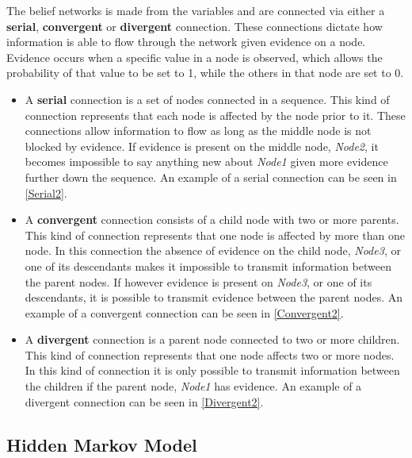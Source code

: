 The belief networks is made from the variables and are connected via either a
\textbf{serial}, \textbf{convergent} or \textbf{divergent} connection. These
connections dictate how information is able to flow through the network given
evidence on a node. Evidence occurs when a specific value in a node is observed,
which allows the probability of that value to be set to 1, while the others in
that node are set to 0.
\begin{itemize}
  \item A \textbf{serial} connection is a set of nodes connected in a sequence.
  This kind of connection represents that each node is affected by the node
  prior to it. These connections allow information to flow as long as the middle
  node is not blocked by evidence. If evidence is present on the middle node,
  \textit{Node2}, it becomes impossible to say anything new about
  \textit{Node1} given more evidence further down the sequence. An example of a
  serial connection can be seen in \autoref{Serial2}.
  \item A \textbf{convergent} connection consists of a child node with two or
  more parents. This kind of connection represents that one node is affected by
  more than one node. In this connection the absence of evidence on the child
  node, \textit{Node3}, or one of its descendants makes it impossible to
  transmit information between the parent nodes. If however evidence is present
  on \textit{Node3}, or one of its descendants, it is possible to transmit
  evidence between the parent nodes. An example of a convergent connection can
  be seen in \autoref{Convergent2}.
  \item A \textbf{divergent} connection is a parent node connected to two or
  more children. This kind of connection represents that one node affects two or
  more nodes. In this kind of connection it is only possible to transmit
  information between the children if the parent node, \textit{Node1}
  has evidence. An example of a divergent connection can be seen in
  \autoref{Divergent2}.
\end{itemize}



\subsection{Hidden Markov Model}


